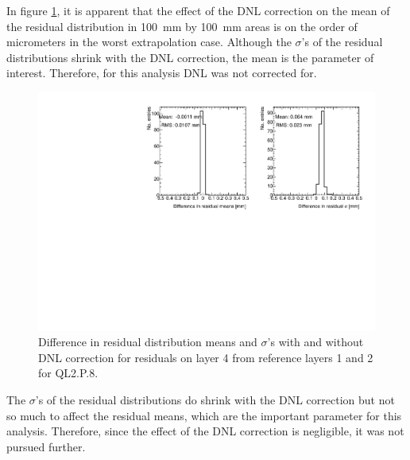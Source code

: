 In figure \ref{fig:dnl_compare_fits}, it is apparent that the effect of the DNL correction on the mean of the residual distribution in \SI{100}{\milli\meter} by \SI{100}{\milli\meter} areas is on the order of micrometers in the worst extrapolation case. Although the $\sigma$'s of the residual distributions shrink with the DNL correction, the mean is the parameter of interest. Therefore, for this analysis DNL was not corrected for.

\begin{figure}
    \centering
    \includegraphics[width = \textwidth]{figures/figure_compare_residual_fits_QL2P08_3100V_2021-06-18_no_dnl_minus_QL2P08_3100V_2021-06-18_2_50um_universal_DNL_layer4_fixedlayers12.pdf}
    \caption{Difference in residual distribution means and $\sigma$'s with and without DNL correction for residuals on layer 4 from reference layers 1 and 2 for QL2.P.8.}
    \label{fig:dnl_compare_fits}
\end{figure}

The $\sigma$'s of the residual distributions do shrink with the DNL correction but not so much to affect the residual means, which are the important parameter for this analysis. Therefore, since the effect of the DNL correction is negligible, it was not pursued further.






























